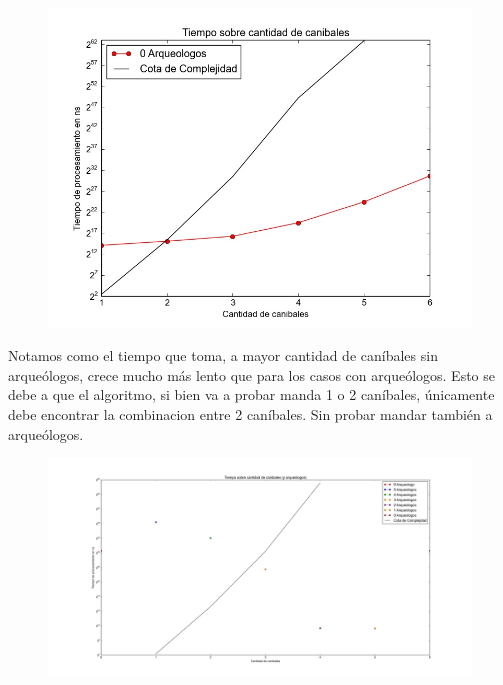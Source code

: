   \begin{figure}[H]
      \begin{center}
        \includegraphics[width=0.7\columnwidth]{imagenes/ej1exp2cotaCorregida.jpeg}
        \caption{}
      \end{center}
  \end{figure}

  Notamos como el tiempo que toma, a mayor cantidad de caníbales sin arqueólogos, crece mucho más lento que para los casos con arqueólogos. Esto se debe a que el algoritmo, si bien va a probar manda 1 o 2 caníbales, únicamente debe encontrar la combinacion entre 2 caníbales. Sin probar mandar también a arqueólogos.


  \begin{figure}[H]
    \begin{center}
      \includegraphics[width=1.1\columnwidth]{imagenes/ej1exp3NuevaVersion.jpeg}
      \caption{}
    \end{center}
  \end{figure}


